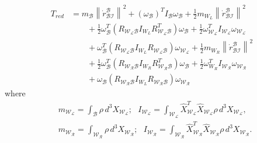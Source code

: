 \documentclass[letterpaper, 10 pt, conference]{ieeeconf}  \newcommand{\RN}[1]{\textup{\uppercase\expandafter{\romannumeral#1}}}
\newcommand{\norm}[1]{\left\lVert{#1}\right\rVert}
\begin{document}
\begin{align*}
T_{red}&  = m_\mathcal{B} \norm{\dot{r}_{\mathcal{BI}}^{\mathcal{B}}}^2 + (\omega_\mathcal{B})^{T}I_\mathcal{B}\omega_\mathcal{B} + \frac{1}{2}m_{W_L}\norm{\dot{r}_{\mathcal{BI}}^{\mathcal{B}}}^2\\
& \quad \quad + \frac{1}{2}\omega_{\mathcal{B}}^{T}(R_{\mathcal{W_LB}}I_{W_L}R_{\mathcal{W_LB}}^T)\omega_{\mathcal{B}} + \frac{1}{2}\omega_{\mathcal{W_L}}^{T}I_{\mathcal{W_L}}\omega_{\mathcal{W_L}} \\
& \quad \quad + \omega_{\mathcal{B}}^{T} (R_{\mathcal{W_LB}}I_{W_L} R_{\mathcal{W_LB}}) \omega_{\mathcal{W_L}} + \frac{1}{2}m_{W_R}\norm{\dot{r}_{\mathcal{BI}}^{\mathcal{B}}}^2 \\
&\quad \quad +\frac{1}{2}\omega_{\mathcal{B}}^T(R_{\mathcal{W_RB}}I_{W_R}R_{\mathcal{W_RB}}^T)\omega_{\mathcal{B}} + \frac{1}{2}\omega_{W_R}^{T}I_{\mathcal{W_R}}\omega_{\mathcal{W_R}} \\
& \quad \quad + \omega_{\mathcal{B}} (R_{\mathcal{W_RB}}I_{W_L} R_{\mathcal{W_RB}}) \omega_{\mathcal{W_R}}
\end{align*}
where 
\begin{align*}
& m_\mathcal{W_L}=\int_\mathcal{B} \rho \, d^3X_{\mathcal{W_L}}; \:\:\: I_\mathcal{W_L}=\int_\mathcal{W_L}\widehat{X}_{\mathcal{W_L}}^T\widehat{X}_{\mathcal{W_L}}\rho \, d^3X_{\mathcal{W_L}}, \\
& m_\mathcal{W_R}=\int_\mathcal{W_R} \rho \, d^3X_{\mathcal{W_R}}; \:\:\: I_\mathcal{W_R}=\int_\mathcal{W_R}\widehat{X}_{\mathcal{W_R}}^T\widehat{X}_{\mathcal{W_R}}\rho \, d^3X_{\mathcal{W_R}}.
\end{align*}
\end{document}
